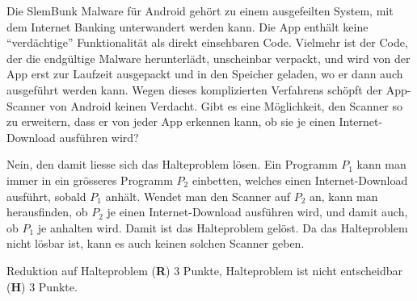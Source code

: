 Die SlemBunk Malware für Android gehört zu einem ausgefeilten
System, mit dem Internet Banking unterwandert werden kann.
Die App enthält keine ``verdächtige'' Funktionalität als direkt
einsehbaren Code. 
Vielmehr ist der Code, der die endgültige Malware herunterlädt,
unscheinbar verpackt, und wird von der App erst zur Laufzeit
ausgepackt und in den Speicher geladen, wo er dann auch ausgeführt
werden kann.
Wegen dieses komplizierten Verfahrens schöpft der App-Scanner von
Android keinen Verdacht.
Gibt es eine Möglichkeit, den Scanner so zu erweitern, dass er 
von jeder App erkennen kann, ob sie je einen Internet-Download
ausführen wird?


\begin{loesung}
Nein, den damit liesse sich das Halteproblem lösen.
Ein Programm $P_1$ kann man immer in ein grösseres Programm $P_2$
einbetten, welches einen Internet-Download ausführt, sobald $P_1$
anhält.
Wendet man den Scanner auf $P_2$ an,
kann man herausfinden, ob $P_2$
je einen Internet-Download ausführen wird, und damit auch, ob
$P_1$ je anhalten wird.
Damit ist das Halteproblem gelöst.
Da das Halteproblem nicht lösbar ist, kann es auch keinen solchen
Scanner geben.
\end{loesung}

\begin{bewertung}
Reduktion auf Halteproblem ({\bf R}) 3 Punkte,
Halteproblem ist nicht entscheidbar ({\bf H}) 3 Punkte.
\end{bewertung}



